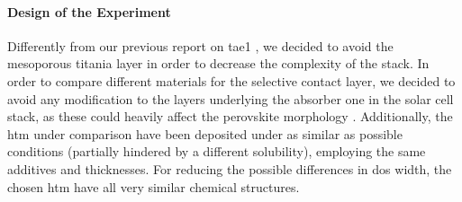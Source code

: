 \begin{figure}
\end{figure}

\paragraph{Design of the Experiment}
Differently from our previous report on \gls{tae1} \cite{Cabau2015a}, we decided to avoid the mesoporous titania layer in order to decrease the complexity of the stack.
In order to compare different materials for the selective contact layer, we decided to avoid any modification to the layers underlying the absorber one in the solar cell stack, as these could heavily affect the perovskite morphology \cite{Tao2017}.
Additionally, the \gls{htm} under comparison have been deposited under as similar as possible conditions (partially hindered by a different solubility), employing the same additives and thicknesses.
For reducing the possible differences in \gls{dos} width, the chosen \gls{htm} have all very similar chemical structures.


